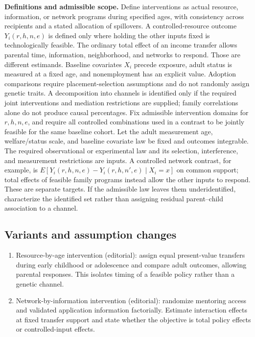 \documentclass[11pt,a4paper]{article}
\begin{document}
\textbf{Definitions and admissible scope.} Define interventions as actual resource, information, or network programs during specified ages, with consistency across recipients and a stated allocation of spillovers. A controlled-resource outcome \(Y_i(r,h,n,e)\) is defined only where holding the other inputs fixed is technologically feasible. The ordinary total effect of an income transfer allows parental time, information, neighborhood, and networks to respond. Those are different estimands. Baseline covariates \(X_i\) precede exposure, adult status is measured at a fixed age, and nonemployment has an explicit value. Adoption comparisons require placement-selection assumptions and do not randomly assign genetic traits. A decomposition into channels is identified only if the required joint interventions and mediation restrictions are supplied; family correlations alone do not produce causal percentages. Fix admissible intervention domains for \(r,h,n,e\), and require all controlled combinations used in a contrast to be jointly feasible for the same baseline cohort. Let the adult measurement age, welfare/status scale, and baseline covariate law be fixed and outcomes integrable. The required observational or experimental law and its selection, interference, and measurement restrictions are inputs. A controlled network contrast, for example, is \(E[Y_i(r,h,n,e)-Y_i(r,h,n',e)\mid X_i=x]\) on common support; total effects of feasible family programs instead allow the other inputs to respond. These are separate targets. If the admissible law leaves them underidentified, characterize the identified set rather than assigning residual parent--child association to a channel.
\subsection*{Variants and assumption changes}
\begin{enumerate}
\item Resource-by-age intervention (editorial): assign equal present-value transfers during early childhood or adolescence and compare adult outcomes, allowing parental responses. This isolates timing of a feasible policy rather than a genetic channel.
\item Network-by-information intervention (editorial): randomize mentoring access and validated application information factorially. Estimate interaction effects at fixed transfer support and state whether the objective is total policy effects or controlled-input effects.
\end{enumerate}
\end{document}
